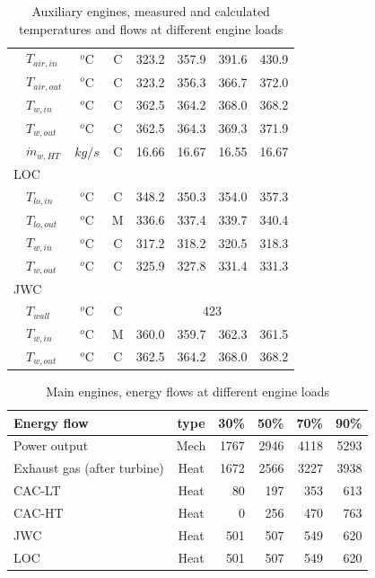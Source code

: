 \documentclass[preprint,12pt]{elsarticle}
\begin{document}
\begin{table}
\begin{tabular}{llccrrrr}
		&	$T_{air,in}$   		& $^o$C & C  & 323.2 & 357.9 & 391.6 & 430.9 \\ 
		&	$T_{air,out}$   	& $^o$C & C  & 323.2 & 356.3 & 366.7 & 372.0 \\ 
		&	$T_{w,in}$    		& $^o$C & C  & 362.5 & 364.2 & 368.0 & 368.2 \\
		&	$T_{w,out}$   		& $^o$C & C  & 362.5 & 364.3 & 369.3 & 371.9 \\
		& 	$\dot{m}_{w,HT}$  	& $kg/s$ & C & 16.66 & 16.67 & 16.55 & 16.67 \\
		\multicolumn{2}{l}{LOC} & & & & & &  \\
		&	$T_{lo,in}$   		& $^o$C & C  & 348.2 & 350.3 & 354.0 & 357.3 \\
		&	$T_{lo,out}$    	& $^o$C & M  & 336.6 & 337.4 & 339.7 & 340.4 \\
		&	$T_{w,in}$    		& $^o$C & C & 317.2 & 318.2 & 320.5 & 318.3 \\ 
		&	$T_{w,out}$   		& $^o$C & C  & 325.9 & 327.8 & 331.4 & 331.3 \\
		\multicolumn{2}{l}{JWC} & & & & & & \\
		&	$T_{wall}$    		& $^o$C & C  & \multicolumn{4}{c}{423}  \\
		&	$T_{w,in}$    		& $^o$C & M  & 360.0 & 359.7 & 362.3 & 361.5 \\
		&	$T_{w,out}$	   		& $^o$C & C  & 362.5 & 364.2 & 368.0 & 368.2 \\  
		\hline
	\end{tabular}
	\caption{Auxiliary engines, measured and calculated temperatures and flows at different engine loads}
	\label{tab:AE_values}
\end{table}

\begin{table}
	\small
	\centering
	\begin{tabular}{lcrrrr}
		\hline
		Energy flow & type & 30\% & 50\% & 70\% & 90\% \\
		\hline
		Power output & Mech &  1767 & 2946 & 4118 & 5293 \\	
		Exhaust gas (after turbine) & Heat & 1672 & 2566 & 3227 & 3938 \\
		CAC-LT & Heat & 80 & 197 & 353 & 613 \\
		CAC-HT & Heat & 0 & 256  & 470 & 763  \\
		JWC & Heat & 501 & 507 & 549 & 620 \\
		LOC & Heat & 501 & 507 & 549 & 620 \\
		\hline
	\end{tabular}
	\caption{Main engines, energy flows at different engine loads}
	\label{tab:ME_flows}
\end{table}
\end{document}
